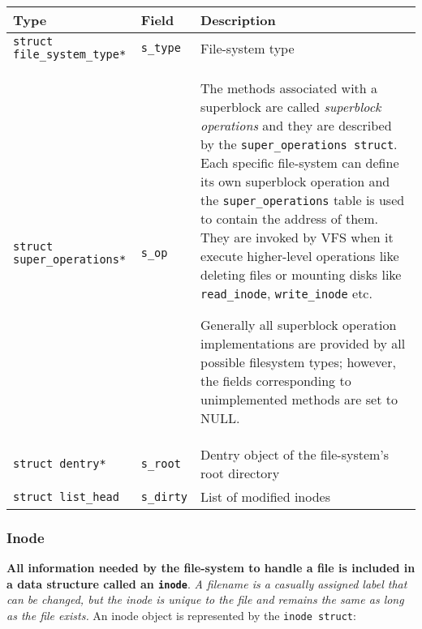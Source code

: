\documentclass[10pt,a4paper]{article}
\begin{document}
\begin{center}
\begin{tabular}{l|l|p{13cm}} 

\toprule
Type & Field & Description \\
\midrule

\texttt{struct file\_system\_type*} & \texttt{s\_type} & File-system type 

\\

\texttt{struct super\_operations*} & \texttt{s\_op} & The methods associated with a superblock are called \textit{superblock operations} and they are described by the \texttt{super\_operations struct}. Each specific file-system can define its own superblock operation and the \texttt{super\_operations} table is used to contain the address of them. They are invoked by VFS when it execute higher-level operations like deleting files or mounting disks like \texttt{read\_inode}, \texttt{write\_inode} etc.  

Generally all superblock operation implementations are provided by all possible filesystem types; however, the fields corresponding to unimplemented methods are set to NULL.

\\

\texttt{struct dentry*} & \texttt{s\_root} & Dentry object of the file-system's root directory 

\\

\texttt{struct list\_head} & \texttt{s\_dirty} & List of modified inodes 

\\
 
\bottomrule
\end{tabular}
\end{center}

\subsubsection{Inode}

\textbf{All information needed by the file-system to handle a file is included in a data structure called an \texttt{inode}}. \textit{A filename is a casually assigned label that can be changed, but the inode is unique to the file and remains the same as long as the file exists.} An inode object is represented by the \texttt{inode struct}:
\end{document}

